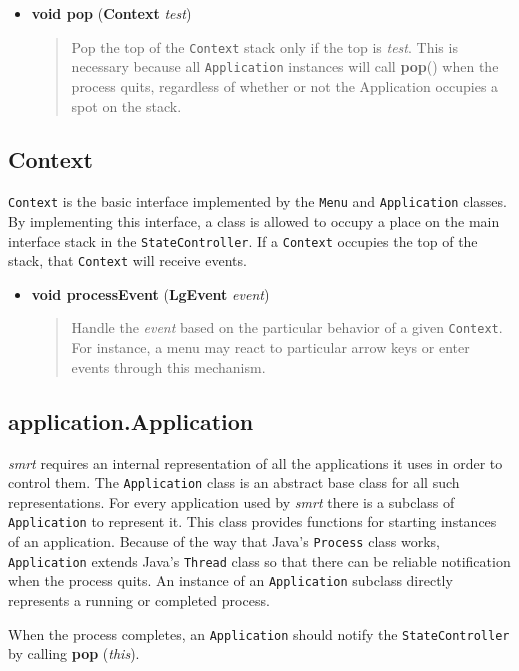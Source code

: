 \documentclass[letterpaper, titlepage, 11pt]{article}
\begin{document}
\begin{itemize}
\item[] \textbf{void pop} (\textbf{Context} \textit{test})
\begin{quotation}
Pop the top of the \texttt{Context} stack only if the top is \textit{test}.
This is necessary because all \texttt{Application} instances will call
\textbf{pop}() when the process quits, regardless of whether or not the
Application occupies a spot on the stack.
\end{quotation}
\end{itemize}

\subsection{Context}
\texttt{Context} is the basic interface implemented by the \texttt{Menu} and
\texttt{Application} classes.  By implementing this interface, a class is
allowed to occupy a place on the main interface stack in the
\texttt{StateController}.  If a \texttt{Context} occupies the top of the stack,
that \texttt{Context} will receive events.

\begin{itemize}
\item[] \textbf{void processEvent} (\textbf{LgEvent} \textit{event})
\begin{quotation}
Handle the \textit{event} based on the particular behavior of a given
\texttt{Context}. For instance, a menu may react to particular arrow keys or
enter events through this mechanism.
\end{quotation}
\end{itemize}

\subsection{application.Application}
\textit{smrt} requires an internal representation of all the applications it
uses in order to control them. The \texttt{Application} class is an abstract
base class for all such representations. For every application used by
\textit{smrt} there is a subclass of \texttt{Application} to represent it.  This
class provides functions for starting instances of an application.  Because of
the way that Java's \texttt{Process} class works, \texttt{Application} extends
Java's \texttt{Thread} class so that there can be reliable notification when
the process quits.  An instance of an \texttt{Application} subclass directly
represents a running or completed process.

When the process completes, an \texttt{Application} should notify the
\texttt{StateController} by calling \textbf{pop} (\textit{this}).
\end{document}
